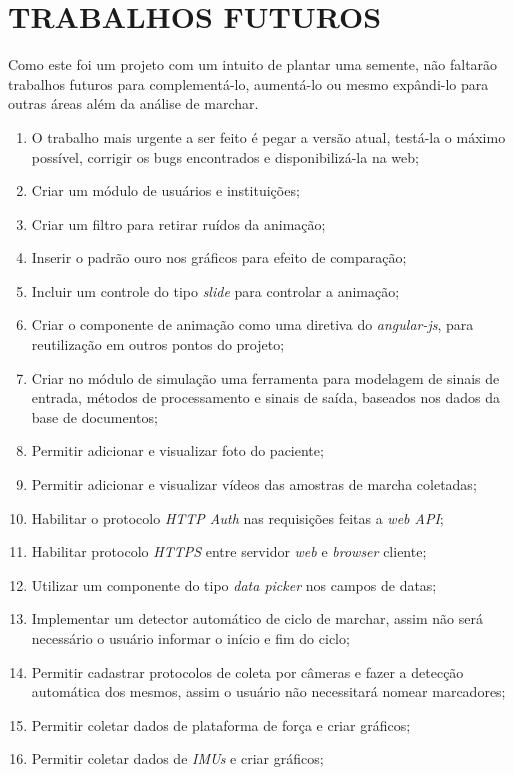 \chapter[TRABALHOS FUTUROS]{\textbf{TRABALHOS FUTUROS}}
Como este foi um projeto com um intuito de plantar uma semente, não faltarão trabalhos futuros para complementá-lo, aumentá-lo ou mesmo expândi-lo para outras áreas além da análise de marchar.
\begin{enumerate}
	\item O trabalho mais urgente a ser feito é pegar a versão atual, testá-la o máximo possível, corrigir os bugs encontrados e disponibilizá-la na web;
	\item Criar um módulo de usuários e instituições;
	\item Criar um filtro para retirar ruídos da animação;
	\item Inserir o padrão ouro nos gráficos para efeito de comparação;
	\item Incluir um controle do tipo \emph{slide} para controlar a animação;
	\item Criar o componente de animação como uma diretiva do \emph{angular-js}, para reutilização em outros pontos do projeto;
	\item Criar no módulo de simulação uma ferramenta para modelagem de sinais de entrada, métodos de processamento e sinais de saída, baseados nos dados da base de documentos;
	\item Permitir adicionar e visualizar foto do paciente;
	\item Permitir adicionar e visualizar vídeos das amostras de marcha coletadas;
	\item Habilitar o protocolo \emph{HTTP Auth} nas requisições feitas a \emph{web API};
	\item Habilitar protocolo \emph{HTTPS} entre servidor \emph{web} e \emph{browser} cliente;
	\item Utilizar um componente do tipo \emph{data picker} nos campos de datas;
	\item Implementar um detector automático de ciclo de marchar, assim não será necessário o usuário informar o início e fim do ciclo;
	\item Permitir cadastrar protocolos de coleta por câmeras e fazer a detecção automática dos mesmos, assim o usuário não necessitará nomear marcadores;
	\item Permitir coletar dados de plataforma de força e criar gráficos;
	\item Permitir coletar dados de \emph{IMUs} e criar gráficos;

\end{enumerate}
